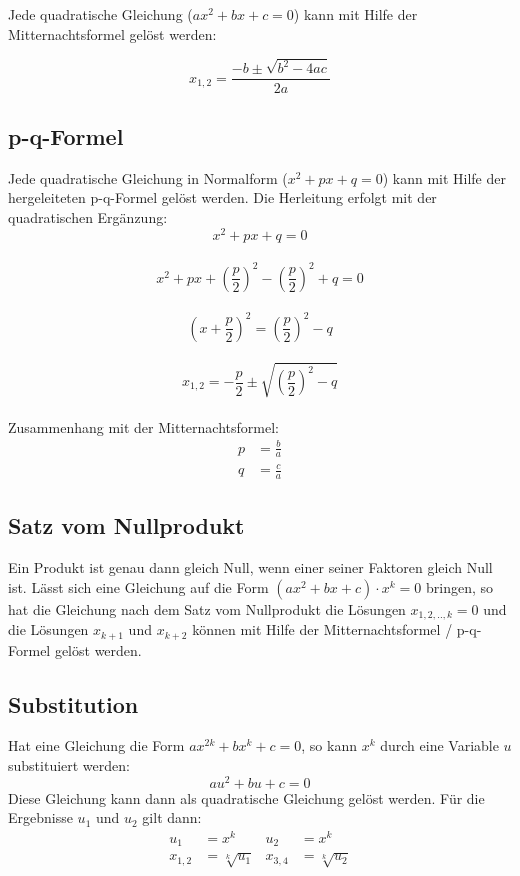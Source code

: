 			Jede quadratische Gleichung ($ ax^2 + bx + c = 0 $) kann mit Hilfe der Mitternachtsformel gelöst werden:
			
			\[x_{1,2} = \frac{-b \pm \sqrt{b^2 - 4ac}} {2a}\]
			
		\subsection{p-q-Formel}
			
			Jede quadratische Gleichung in Normalform ($ x^2 + px + q = 0 $) kann mit Hilfe der hergeleiteten p-q-Formel gelöst werden. Die Herleitung erfolgt mit der quadratischen Ergänzung:
			\[ x^2 + px + q = 0\]\\
			\[ x^2 + px + \left({}\frac{p}{2}\right)^2 - \left({}\frac{p}{2}\right)^2 + q = 0\]\\
			\[ \left({}x + \frac{p}{2} \right)^2 = \left({}\frac{p}{2}\right)^2 - q\]\\			
			\[ x_{1,2} = - \frac p 2 \pm \sqrt{\left(\frac p 2 \right)^2 - q} \]\\
			Zusammenhang mit der Mitternachtsformel:
            \begin{align*}
              p &= \frac b a\\
              q &= \frac c a
            \end{align*}

		\subsection{Satz vom Nullprodukt}
			
			Ein Produkt ist genau dann gleich Null, wenn einer seiner Faktoren gleich Null ist. 
			Lässt sich eine Gleichung auf die Form $(ax^2 + bx + c) \cdot x^k = 0$ bringen, so hat die Gleichung nach dem Satz vom Nullprodukt die Lösungen 			$x_{1,2,..,k} = 0$ und die Lösungen $x_{k+1}$ und $x_{k+2}$ können mit Hilfe der Mitternachtsformel / p-q-Formel gelöst werden. 
			
		\subsection{Substitution}
		
		Hat eine Gleichung die Form $ax^{2k} + bx^k + c = 0$, so kann $x^k$ durch eine Variable $u$ substituiert werden: 
		\[au^2 + bu + c = 0 \]
		Diese Gleichung kann dann als quadratische Gleichung gelöst werden. Für die Ergebnisse $ u_1 $ und $ u_2 $ gilt dann:
  \begin{align*}      
u_1 & = x^k& u_2 &= x^k \\
x_{1,2} &= \sqrt[k] {u_1} & x_{3,4} &= \sqrt[k] {u_2}
  \end{align*}

